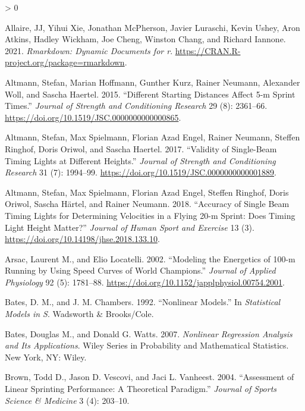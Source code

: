\documentclass[fleqn,10pt]{wlpeerj} %
\newlength{\cslhangindent}
\newenvironment{CSLReferences}[2] %
 {%
  \setlength{\parindent}{0pt}
  \ifodd #1 \everypar{\setlength{\hangindent}{\cslhangindent}}\ignorespaces\fi
  \ifnum #2 > 0
  \setlength{\parskip}{#2\baselineskip}
  \fi
 }%
 {}
\begin{document}
\hypertarget{refs}{}
\begin{CSLReferences}{1}{0}
\leavevmode\hypertarget{ref-R-rmarkdown}{}%
Allaire, JJ, Yihui Xie, Jonathan McPherson, Javier Luraschi, Kevin Ushey, Aron Atkins, Hadley Wickham, Joe Cheng, Winston Chang, and Richard Iannone. 2021. \emph{Rmarkdown: Dynamic Documents for r}. \url{https://CRAN.R-project.org/package=rmarkdown}.

\leavevmode\hypertarget{ref-altmannDifferentStartingDistances2015}{}%
Altmann, Stefan, Marian Hoffmann, Gunther Kurz, Rainer Neumann, Alexander Woll, and Sascha Haertel. 2015. {``Different {Starting Distances Affect} 5-m {Sprint Times}.''} \emph{Journal of Strength and Conditioning Research} 29 (8): 2361--66. \url{https://doi.org/10.1519/JSC.0000000000000865}.

\leavevmode\hypertarget{ref-altmannValiditySingleBeamTiming2017}{}%
Altmann, Stefan, Max Spielmann, Florian Azad Engel, Rainer Neumann, Steffen Ringhof, Doris Oriwol, and Sascha Haertel. 2017. {``Validity of {Single}-{Beam Timing Lights} at {Different Heights}.''} \emph{Journal of Strength and Conditioning Research} 31 (7): 1994--99. \url{https://doi.org/10.1519/JSC.0000000000001889}.

\leavevmode\hypertarget{ref-altmannAccuracySingleBeam2018}{}%
Altmann, Stefan, Max Spielmann, Florian Azad Engel, Steffen Ringhof, Doris Oriwol, Sascha Härtel, and Rainer Neumann. 2018. {``Accuracy of Single Beam Timing Lights for Determining Velocities in a Flying 20-m Sprint: {Does} Timing Light Height Matter?''} \emph{Journal of Human Sport and Exercise} 13 (3). \url{https://doi.org/10.14198/jhse.2018.133.10}.

\leavevmode\hypertarget{ref-arsacModelingEnergetics100m2002}{}%
Arsac, Laurent M., and Elio Locatelli. 2002. {``Modeling the Energetics of 100-m Running by Using Speed Curves of World Champions.''} \emph{Journal of Applied Physiology} 92 (5): 1781--88. \url{https://doi.org/10.1152/japplphysiol.00754.2001}.

\leavevmode\hypertarget{ref-batesNonlinearModels1992}{}%
Bates, D. M., and J. M. Chambers. 1992. {``Nonlinear Models.''} In \emph{Statistical {Models} in {S}}. {Wadsworth \& Brooks/Cole}.

\leavevmode\hypertarget{ref-batesNonlinearRegressionAnalysis2007}{}%
Bates, Douglas M., and Donald G. Watts. 2007. \emph{Nonlinear Regression Analysis and Its Applications}. Wiley Series in Probability and Mathematical Statistics. {New York, NY}: {Wiley}.

\leavevmode\hypertarget{ref-brownAssessmentLinearSprinting2004}{}%
Brown, Todd D., Jason D. Vescovi, and Jaci L. Vanheest. 2004. {``Assessment of Linear Sprinting Performance: A Theoretical Paradigm.''} \emph{Journal of Sports Science \& Medicine} 3 (4): 203--10.


\end{CSLReferences}
\end{document}
